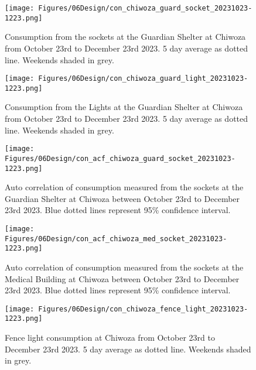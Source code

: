 \begin{figure}
    \centering
    \texttt{[image: Figures/06Design/con\_chiwoza\_guard\_socket\_20231023-1223.png]}
    \caption[Guardina Shelter Socket consumption Chiwoza 20231023-1223]{Consumption from the sockets at the Guardian Shelter at Chiwoza from October 23rd to December 23rd 2023. 5 day average as dotted line. Weekends shaded in grey.}
    \label{fig:con_chiwoza_guard_socket_20231023-1223}
\end{figure}

\begin{figure}
    \centering
    \texttt{[image: Figures/06Design/con\_chiwoza\_guard\_light\_20231023-1223.png]}
    \caption[Guardian Shelter Light consumption Chiwoza 20231023-1223]{Consumption from the Lights at the Guardian Shelter at Chiwoza from October 23rd to December 23rd 2023. 5 day average as dotted line. Weekends shaded in grey.}
    \label{fig:con_chiwoza_guard_light_20231023-1223}
\end{figure}

\begin{figure}
\centering
\texttt{[image: Figures/06Design/con\_acf\_chiwoza\_guard\_socket\_20231023-1223.png]}
\caption[ACF Guardian shelter socket consumption Chiwoza 20231023-1223]{Auto correlation of consumption measured from the sockets at the Guardian Shelter at Chiwoza between October 23rd to December 23rd 2023. Blue dotted lines represent 95\% confidence interval.}
\label{fig:con_acf_chiwoza_guard_socket_20231023-1223}
\end{figure}

\begin{figure}
\centering
\texttt{[image: Figures/06Design/con\_acf\_chiwoza\_med\_socket\_20231023-1223.png]}
\caption[ACF Medical Socket consumption Chiwoza 20231023-1223]{Auto correlation of consumption measured from the sockets at the Medical Building at Chiwoza between October 23rd to December 23rd 2023. Blue dotted lines represent 95\% confidence interval.}
\label{fig:con_acf_chiwoza_med_socket_20231023-1223}
\end{figure}

\begin{figure}
    \centering
    \texttt{[image: Figures/06Design/con\_chiwoza\_fence\_light\_20231023-1223.png]}
    \caption[Fence Light consumption Chiwoza 20231023-1223]{Fence light consumption at Chiwoza from October 23rd to December 23rd 2023. 5 day average as dotted line. Weekends shaded in grey.}
    \label{fig:con_chiwoza_fence_light_20231023-1223}
\end{figure}

